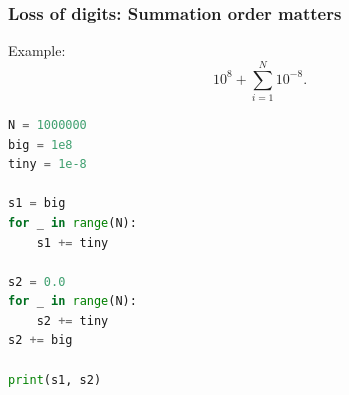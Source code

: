 










\begin{frame}[fragile]
  \frametitle{Loss of digits: Summation order matters}
  Example:
  \[
    10^8 + \sum_{i=1}^N 10^{-8}.
  \]

  \begin{lstlisting}[language=Python]
N = 1000000
big = 1e8
tiny = 1e-8

s1 = big
for _ in range(N):
    s1 += tiny

s2 = 0.0
for _ in range(N):
    s2 += tiny
s2 += big

print(s1, s2)
  \end{lstlisting}
\end{frame}


